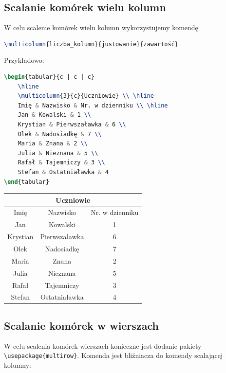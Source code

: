 \documentclass[10pt,a4paper]{article}
\begin{document}
\subsection{Scalanie komórek wielu kolumn}

W celu scalenie komórek wielu kolumn wykorzystujemy komendę

\begin{lstlisting}[language=TeX]
\multicolumn{liczba_kolumn}{justowanie}{zawartość}
\end{lstlisting}

Przykładowo:

\begin{lstlisting}[language=TeX]
\begin{tabular}{c | c | c}
	\hline
	\multicolumn{3}{c}{Uczniowie} \\ \hline
	Imię & Nazwisko & Nr. w dzienniku \\ \hline
	Jan & Kowalski & 1 \\
	Krystian & Pierwszaławka & 6 \\
	Olek & Nadosiadkę & 7 \\
	Maria & Znana & 2 \\
	Julia & Nieznana & 5 \\
	Rafał & Tajemniczy & 3 \\
	Stefan & Ostatniaławka & 4
\end{tabular}
\end{lstlisting}

\begin{tabular}{c | c | c}
	\hline
	\multicolumn{3}{c}{Uczniowie} \\ \hline
	Imię & Nazwisko & Nr. w dzienniku \\ \hline
	Jan & Kowalski & 1 \\
	Krystian & Pierwszaławka & 6 \\
	Olek & Nadosiadkę & 7 \\
	Maria & Znana & 2 \\
	Julia & Nieznana & 5 \\
	Rafał & Tajemniczy & 3 \\
	Stefan & Ostatniaławka & 4
\end{tabular}

\subsection{Scalanie komórek w wierszach}

W celu scalenia komórek wierszach konieczne jest dodanie pakiety \lstinline|\usepackage{multirow}|. Komenda jest bliźniacza do komendy scalającej kolumny:
\end{document}
